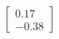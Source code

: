 \documentclass[preview]{standalone}
\begin{document}
\begin{align*}
\begin{bmatrix} 0.17 \\ -0.38 \end{bmatrix}
\end{align*}
\end{document}
